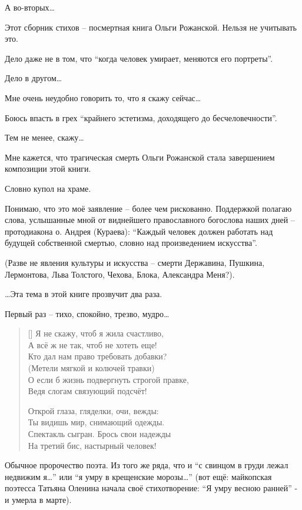 \documentclass[12pt,a5paper,twoside]{article}
\begin{document}
А во-вторых…

Этот сборник стихов -- посмертная книга Ольги Рожанской. Нельзя не учитывать это.

Дело даже не в том, что ``когда человек умирает, меняются его портреты''.

Дело в другом…

Мне очень неудобно говорить то, что я скажу сейчас…

Боюсь впасть в грех ``крайнего эстетизма, доходящего до бесчеловечности''.

Тем не менее, скажу…

Мне кажется, что трагическая смерть Ольги Рожанской стала завершением композиции этой книги.

Словно купол на храме.

Понимаю, что это моё заявление -- более чем рискованно. Поддержкой полагаю слова, услышанные 
мной от виднейшего православного богослова наших дней -- протодиакона о. Андрея (Кураева): 
``Каждый человек должен работать над будущей собственной смертью, словно над произведением искусства''.

(Разве не явления культуры и искусства -- смерти Державина, Пушкина, Лермонтова, 
Льва Толстого, Чехова, Блока, Александра Меня?).

…Эта тема в этой книге прозвучит два раза.

Первый раз -- тихо, спокойно, трезво, мудро…

\settowidth{\versewidth}{Я не скажу, чтоб я жила счастливо,}
\begin{verse}[\versewidth]
Я не скажу, чтоб я жила счастливо,\\
А всё ж не так, чтоб не хотеть еще!\\
Кто дал нам право требовать добавки?\\
(Метели мягкой и колючей травки)\\
О если б жизнь подвергнуть строгой правке,\\
Ведя слогам связующий подсчёт!

Открой глаза, гляделки, очи, вежды:\\
Ты видишь мир, снимающий одежды.\\
Спектакль сыгран. Брось свои надежды\\
На третий бис, настырный человек!
\end{verse}

Обычное пророчество поэта. Из того же ряда, что и ``с свинцом в груди лежал недвижим я…'' или ``я умру в крещенские морозы…'' (вот ещё: майкопская поэтесса Татьяна Оленина начала своё стихотворение: ``Я умру весною ранней'' - и умерла в марте).
\end{document}
